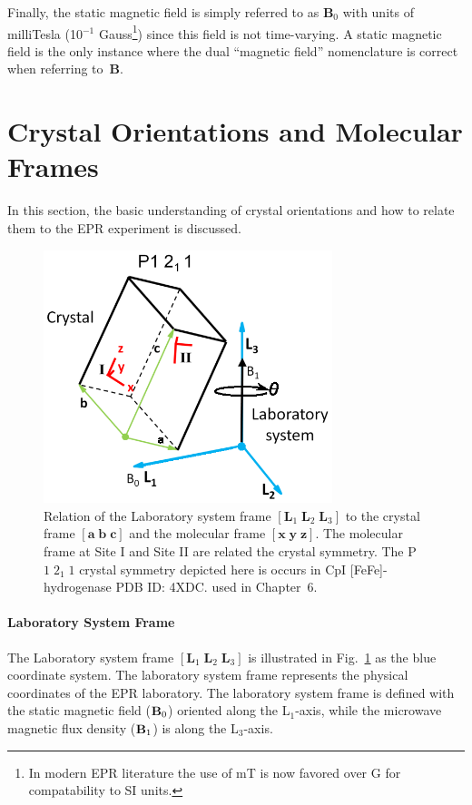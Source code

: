 Finally, the static magnetic field is simply referred to as $\mathbf{B}_0$ with units of milliTesla (10$^{-1}$ Gauss\footnote{In modern EPR literature the use of mT is now favored over G for compatability to SI units.}) since this field is not time-varying. A static magnetic field is the only instance where the dual ``magnetic field'' nomenclature is correct when referring to~$\mathbf{B}$.

\section{Crystal Orientations and Molecular Frames}
In this section, the basic understanding of crystal orientations and how to relate them to the EPR experiment is discussed. 

\begin{figure}[ht]
 \centering
 \includegraphics[width=0.75\textwidth]{Kapitel/Ch1-images/CrystalRotation.eps}
 \caption[Single crystal EPR frames.]{Relation of the Laboratory system frame $[\mathbf{L}_1\; \mathbf{L}_2\; \mathbf{L}_3]$ to the crystal frame $[\mathbf{a}\; \mathbf{b}\; \mathbf{c}]$ and the molecular frame $[\mathbf{x}\; \mathbf{y}\; \mathbf{z}]$. The molecular frame at Site I and Site II are related the crystal symmetry. The P$1\;2_1\;1$ crystal symmetry depicted here is occurs in CpI [FeFe]-hydrogenase PDB ID: 4XDC.\cite{FeFeCry} used in Chapter~6.}
 \label{fig:CrystalOrientation}
\end{figure}

\paragraph*{Laboratory System Frame} The Laboratory system frame $[\mathbf{L}_1\; \mathbf{L}_2\; \mathbf{L}_3]$ is illustrated in Fig.~\ref{fig:CrystalOrientation} as the blue coordinate system. The laboratory system frame represents the physical coordinates of the EPR laboratory. The laboratory system frame is defined with the static magnetic field (${\textbf B}_0$) oriented along the L$_1$-axis, while the microwave magnetic flux density (${\textbf B}_1$) is along the L$_3$-axis. 

